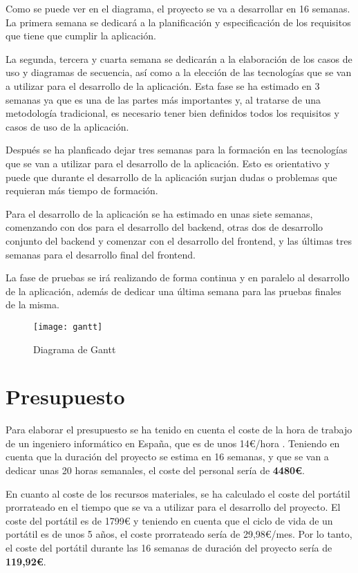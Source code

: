 Como se puede ver en el diagrama, el proyecto se va a desarrollar en 16 semanas. La
primera semana se dedicará a la planificación y especificación de los requisitos
que tiene que cumplir la aplicación.

La segunda, tercera y cuarta semana se dedicarán a la elaboración de los casos de uso
y diagramas de secuencia, así como a la elección de las tecnologías que se van a
utilizar para el desarrollo de la aplicación. Esta fase se ha estimado en 3 semanas
ya que es una de las partes más importantes y, al tratarse de una metodología tradicional,
es necesario tener bien definidos todos los requisitos y casos de uso de la aplicación.

Después se ha planficado dejar tres semanas para la formación en las tecnologías que
se van a utilizar para el desarrollo de la aplicación. Esto es orientativo y puede que
durante el desarrollo de la aplicación surjan dudas o problemas que requieran más
tiempo de formación.

Para el desarrollo de la aplicación se ha estimado en unas siete semanas, comenzando
con dos para el desarrollo del backend, otras dos de desarrollo conjunto del backend
y comenzar con el desarrollo del frontend, y las últimas tres semanas para el desarrollo
final del frontend.

La fase de pruebas se irá realizando de forma continua y en paralelo al desarrollo
de la aplicación, además de dedicar una última semana para las pruebas finales de
la misma.

\begin{figure}[H]
  \centering
  \texttt{[image: gantt]}
  \caption{Diagrama de Gantt}
  \label{fig:gantt}
\end{figure}

\section{Presupuesto}
Para elaborar el presupuesto se ha tenido en cuenta el coste de la hora de trabajo
de un ingeniero informático en España, que es de unos 14€/hora \cite{coste-hora}.
Teniendo en cuenta que la duración del proyecto se estima en 16 semanas, y que
se van a dedicar unas 20 horas semanales, el coste del personal sería de \textbf{4480€}.

\vspace{1cm}

En cuanto al coste de los recursos materiales, se ha calculado el coste del portátil
prorrateado en el tiempo que se va a utilizar para el desarrollo del proyecto. El
coste del portátil es de 1799€ \cite{portatil} y teniendo en cuenta que el ciclo de vida de un
portátil es de unos 5 años, el coste prorrateado sería de 29,98€/mes. Por lo tanto,
el coste del portátil durante las 16 semanas de duración del proyecto sería de
\textbf{119,92€}.

